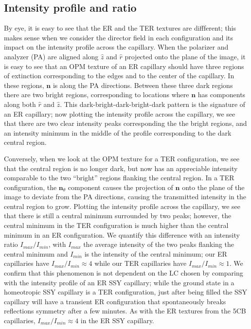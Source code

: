 \subsection{Intensity profile and ratio}
By eye, it is easy to see that the ER and the TER textures are diffferent; this makes sense when we consider the director field in each configuration and its impact on the intensity profile across the capillary.
When the polarizer and analyzer (PA) are aligned along $\hat{z}$ and $\hat{r}$ projected onto the plane of the image, it is easy to see that an OPM texture of an ER capillary should have three regions of extinction corresponding to the edges and  to the center of the capillary.
In these regions, $\mathbf{n}$ is along the PA directions.
Between these three dark regions there are two bright regions, corresponding to locations where $\mathbf{n}$ has components along both $\hat{r}$ and $\hat{z}$.
This dark-bright-dark-bright-dark pattern is the signature of an ER capillary; now plotting the intensity profile across the capillary, we see that there are two clear intensity peaks corresponding the the bright regions, and an intensity minimum in the middle of the profile corresponding to the dark central region.

Conversely, when we look at the OPM texture for a TER configuration, we see that the central region is no longer dark, but now has an appreciable intensity comparable to the two ``bright'' regions flanking the central region.
In a TER configuration, the $\mathbf{n}_{\theta}$ component causes the projection of $\mathbf{n}$ onto the plane of the image to deviate from the PA directions, causing the transmitted intensity in the central region to grow.
Plotting the intensity profile across the capillary, we see that there is still a central minimum surrounded by two peaks; however, the central minimum in the TER configuration is much higher than the central minimum in an ER configuration.
We quantify this difference with an intensity ratio $I_{max}/I_{min}$, with $I_{max}$ the average intensity of the two peaks flanking the central minimum and $I_{min}$ is the intensity of the central minimum; our ER capillaries have $I_{max}/I_{min} \approx 4$ while our TER capillaries have $I_{max}/I_{min} \approx 1$.
We confirm that this phenomenon is not dependent on the LC chosen by comparing with the intensity profile of an ER SSY capillary; while the ground state in a homeotropic SSY capillary is a TER configuration, just after being filled the SSY capillary will have a transient ER configuration that spontaneously breaks reflections symmetry after a few minutes.
As with the ER textures from the 5CB capillaries, $I_{max}/I_{min} \approx 4$ in the ER SSY capillary.




